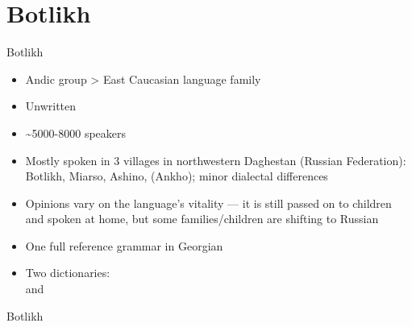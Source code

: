 
 



\begin{frame}
\titlepage

\end{frame}

\section{Botlikh}
\begin{frame}{Botlikh}
\begin{itemize}
    \item Andic group > East Caucasian language family
    \item Unwritten
    \item \textasciitilde{}5000-8000 speakers
    \item Mostly spoken in 3 villages in northwestern Daghestan (Russian Federation): Botlikh, Miarso, Ashino, (Ankho); minor dialectal differences
    \item Opinions vary on the language's vitality --- it is still passed on to children and spoken at home, but some families/children are shifting to Russian
    \pause
    \item One full reference grammar in Georgian  \citep{gudava1962}
    \item Two dictionaries: \\
    \citep{saidovaabusov2012} and \citep{alekseev2019}
\end{itemize}
\end{frame}

\begin{frame}{Botlikh}
\begin{figure}[h]
\centering
{}
\end{figure}
\end{frame}

